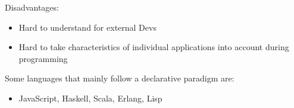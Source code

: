Disadvantages:
\begin{itemize}[noitemsep]
    \item Hard to understand for external Devs
    \item Hard to take characteristics of individual applications into account during programming
\end{itemize}

Some languages that mainly follow a declarative paradigm are:
\begin{itemize}
    \item JavaScript, Haskell, Scala, Erlang, Lisp
\end{itemize}




 
 
 
